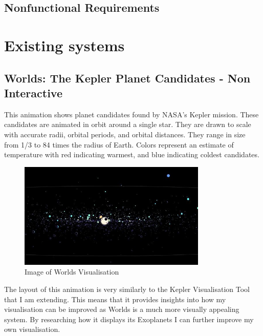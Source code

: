 \subsection{Nonfunctional Requirements}
\section{Existing systems}
\subsection{Worlds: The Kepler Planet Candidates - Non Interactive}
 This animation \cite{worlds} shows  planet candidates found by NASA's Kepler mission. These candidates are animated in orbit around a single star. They are drawn to scale with accurate radii, orbital periods, and orbital distances. They range in size from 1/3 to 84 times the radius of Earth. Colors represent an estimate of temperature with red indicating warmest, and blue indicating coldest candidates. 
\begin{figure}[h!]
  \centering
      \includegraphics[width=0.8\textwidth]{images/worlds.jpg}
  \caption{Image of Worlds Visualisation}
\end{figure}
The layout of this animation is very similarly to the Kepler Visualisation Tool that I am extending. This means that it provides insights into how my visualisation can be improved as Worlds is a much more visually appealing system. By researching how it displays its Exoplanets I can further improve my own visualisation.

